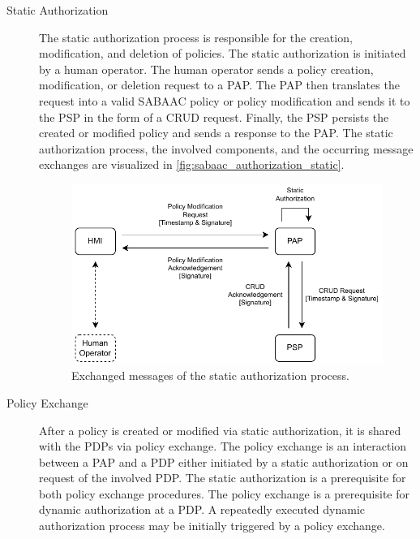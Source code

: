\begin{description}
    \item[Static Authorization] The static authorization process is responsible for the creation, modification, and deletion of policies.
    The static authorization is initiated by a human operator.
    The human operator sends a policy creation, modification, or deletion request to a PAP.
    The PAP then translates the request into a valid SABAAC policy or policy modification and sends it to the PSP in the form of a CRUD request.
    Finally, the PSP persists the created or modified policy and sends a response to the PAP.
    The static authorization process, the involved components, and the occurring message exchanges are visualized in \autoref{fig:sabaac_authorization_static}.
    \begin{figure}
        \centering
        \includegraphics[width=0.9\linewidth]{figures/SABAAC_protocols_authorization_static.drawio.pdf}
        \caption{Exchanged messages of the static authorization process.
        }
        \label{fig:sabaac_authorization_static}
    \end{figure}
    \item[Policy Exchange] After a policy is created or modified via static authorization, it is shared with the PDPs via policy exchange.
    The policy exchange is an interaction between a PAP and a PDP either initiated by a static authorization or on request of the involved PDP.
    The static authorization is a prerequisite for both policy exchange procedures.
    The policy exchange is a prerequisite for dynamic authorization at a PDP.
    A repeatedly executed dynamic authorization process may be initially triggered by a policy exchange.


\end{description}
